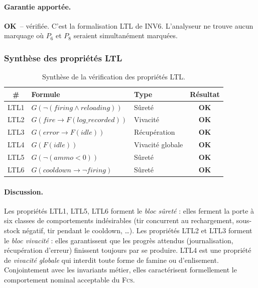\documentclass[11pt,a4paper]{article}
\newcommand{\fcs}{\textsc{Fcs}\xspace}
\newcommand{\OK}{\textcolor{green!50!black}{\textbf{OK}}}
\begin{document}
\paragraph{Garantie apportée.}
\OK\ -- vérifiée. C'est la formalisation LTL de INV6. L'analyseur ne
trouve aucun marquage où $P_6$ et $P_8$ seraient simultanément marquées.

\subsubsection*{Synthèse des propriétés LTL}

\begin{table}[H]
\centering\small
\begin{tabularx}{\linewidth}{c X l c}
\toprule
\rowcolor{tableheader}\textbf{\#} & \textbf{Formule} & \textbf{Type} & \textbf{Résultat} \\
\midrule
LTL1 & $G(\neg(\textit{firing} \wedge \textit{reloading}))$       & Sûreté            & \OK \\
LTL2 & $G(\textit{fire} \rightarrow F(\textit{log\_recorded}))$    & Vivacité          & \OK \\
LTL3 & $G(\textit{error} \rightarrow F(\textit{idle}))$            & Récupération      & \OK \\
LTL4 & $G(F(\textit{idle}))$                                       & Vivacité globale  & \OK \\
LTL5 & $G(\neg(\textit{ammo} < 0))$                                & Sûreté            & \OK \\
LTL6 & $G(\textit{cooldown} \rightarrow \neg \textit{firing})$     & Sûreté            & \OK \\
\bottomrule
\end{tabularx}
\caption{Synthèse de la vérification des propriétés LTL.}
\end{table}

\paragraph{Discussion.}
Les propriétés LTL1, LTL5, LTL6 forment le \emph{bloc sûreté} : elles
ferment la porte à six classes de comportements indésirables (tir
concurrent au rechargement, sous-stock négatif, tir pendant le cooldown,
\dots). Les propriétés LTL2 et LTL3 forment le \emph{bloc vivacité} : elles
garantissent que les progrès attendus (journalisation, récupération
d'erreur) finissent toujours par se produire. LTL4 est une propriété de
\emph{vivacité globale} qui interdit toute forme de famine ou
d'enlisement. Conjointement avec les invariants métier, elles caractérisent
formellement le comportement nominal acceptable du \fcs.
\end{document}
